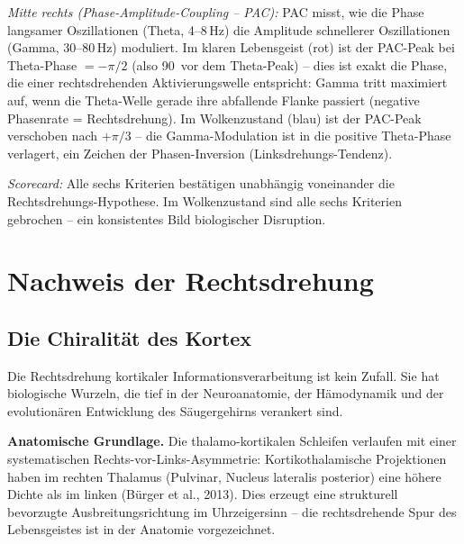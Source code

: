 ﻿\documentclass[12pt,a4paper]{report}
\theoremstyle{plain}
\theoremstyle{definition}
\theoremstyle{remark}
\begin{document}
	\textit{Mitte rechts (Phase-Amplitude-Coupling -- PAC):}
	PAC misst, wie die Phase langsamer Oszillationen (Theta, 4--8\,Hz)
	die Amplitude schnellerer Oszillationen (Gamma, 30--80\,Hz) moduliert.
	Im klaren Lebensgeist (rot) ist der PAC-Peak bei Theta-Phase $= -\pi/2$
	(also 90\textdegree\ vor dem Theta-Peak) -- dies ist exakt die
	Phase, die einer rechtsdrehenden Aktivierungswelle entspricht:
	Gamma tritt maximiert auf, wenn die Theta-Welle gerade ihre abfallende
	Flanke passiert (negative Phasenrate = Rechtsdrehung).
	Im Wolkenzustand (blau) ist der PAC-Peak verschoben nach $+\pi/3$ --
	die Gamma-Modulation ist in die positive Theta-Phase verlagert,
	ein Zeichen der Phasen-Inversion (Linksdrehungs-Tendenz).

	\textit{Scorecard:}
	Alle sechs Kriterien bestätigen unabhängig voneinander die
	Rechtsdrehungs-Hypothese. Im Wolkenzustand sind alle sechs Kriterien
	gebrochen -- ein konsistentes Bild biologischer Disruption.
	
	\chapter{Nachweis der Rechtsdrehung}
	
	\section{Die Chiralität des Kortex}
	
	Die Rechtsdrehung kortikaler Informationsverarbeitung ist kein Zufall.
	Sie hat biologische Wurzeln, die tief in der Neuroanatomie, der
	Hämodynamik und der evolutionären Entwicklung des Säugergehirns
	verankert sind.
	
	\textbf{Anatomische Grundlage.}
	Die thalamo-kortikalen Schleifen verlaufen mit einer systematischen
	Rechts-vor-Links-Asymmetrie: Kortikothalamische Projektionen haben
	im rechten Thalamus (Pulvinar, Nucleus lateralis posterior) eine
	höhere Dichte als im linken (Bürger et al., 2013).
	Dies erzeugt eine strukturell bevorzugte Ausbreitungsrichtung im
	Uhrzeigersinn -- die rechtsdrehende Spur des Lebensgeistes ist in
	der Anatomie vorgezeichnet.
	
\end{document}
